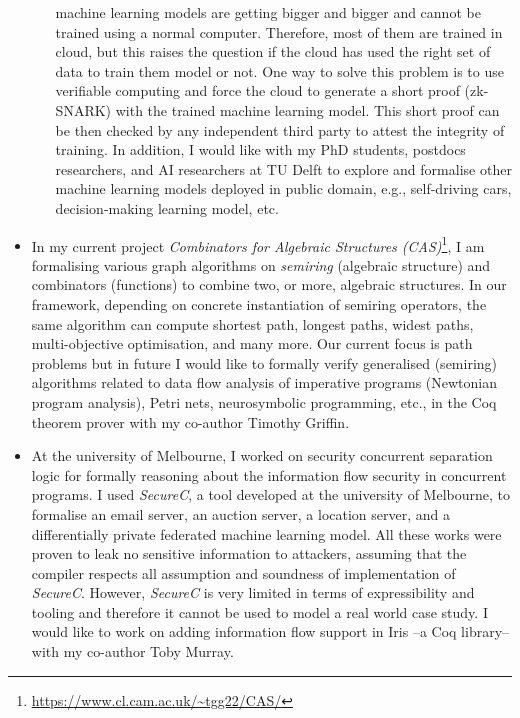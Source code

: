 \documentclass[a4paper]{article}
\begin{document}
\begin{itemize}
\begin{itemize}
   machine learning models are getting bigger and bigger and cannot be trained using a normal computer. 
   Therefore, most of them are trained in cloud, but this 
   raises the question if the cloud has used the right set of data to train them model or not. 
   One way to solve this problem is to use verifiable computing and force the cloud to generate a short proof (zk-SNARK)
   with the trained machine learning model. 
   This short proof can be then checked by any independent third party to attest the 
   integrity of training. In addition, I would like with my PhD students,
   postdocs researchers, and AI researchers at TU Delft to explore and formalise  
   other machine learning models deployed in public domain, e.g., 
   self-driving cars, decision-making learning model, etc. 


	\end{itemize}
	
	


\item In my current project \emph{Combinators for Algebraic 
	Structures (CAS)}\footnote{\url{https://www.cl.cam.ac.uk/~tgg22/CAS/}}, 
	I am formalising various graph algorithms on \emph{semiring} (algebraic 
	structure) and combinators (functions) to combine two, or more, algebraic structures.
	In our framework, depending on concrete instantiation of semiring operators,
	the same algorithm can compute shortest path, longest paths, widest paths, 
	multi-objective optimisation, and many more.
	Our current focus is path problems but in future  
	I would like to formally verify generalised (semiring) algorithms related to 
	data flow analysis of imperative programs (Newtonian program analysis), Petri nets, 
	neurosymbolic programming, etc., in the Coq 
	theorem prover with my co-author Timothy Griffin.  


\item At the university of Melbourne, I worked on 
security concurrent separation logic for formally reasoning about the information 
flow security in concurrent programs. I used \textit{SecureC}, a tool developed at the university of 
Melbourne, to formalise an email server, an auction server, a location server, and 
a differentially private federated machine learning model. 
All these works were proven to leak no sensitive 
information to attackers, assuming that the compiler respects all 
assumption and soundness of implementation of \textit{SecureC}. However, 
\textit{SecureC} is very limited in terms of expressibility and tooling 
and therefore it cannot be used to model a real world case study. I would like to work on 
adding information flow support in Iris --a Coq library-- with my co-author Toby Murray.


\end{itemize}
\end{document}
